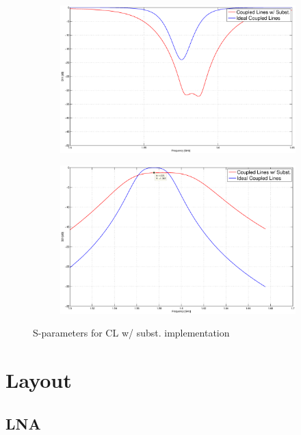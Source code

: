 \documentclass[a4paper]{article}        %
\begin{document}
  \begin{figure}[H]
  		\centering
  	\begin{subfigure}{0.8\textwidth}
  	\includegraphics[width=\textwidth]{fig/Filter/2nd_order/plots/S11_subst_CL.eps}
  	\end{subfigure}
  	\begin{subfigure}{0.8\textwidth}
  	\includegraphics[width=\textwidth]{fig/Filter/2nd_order/plots/S21_subst_CL.eps}
  	\end{subfigure}
  	\caption{S-parameters for CL w/ subst. implementation}
  	\label{fig:filter_spar_subst_CL}
  \end{figure}

\section{Layout}
	\subsection{LNA}
\end{document}
